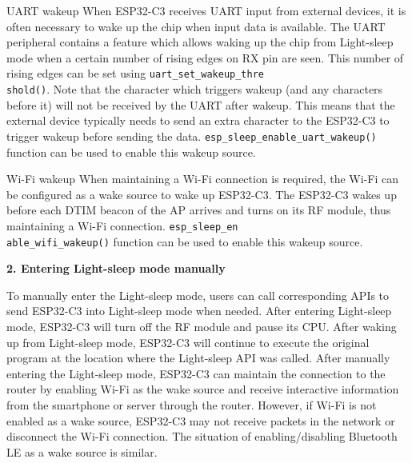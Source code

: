 \documentclass[a4paper,12pt]{book}
\begin{document}
\begin{term}{UART wakeup}
    When ESP32-C3 receives UART input from external devices, it is often necessary to wake up the chip when input data is available. The UART peripheral contains a feature which allows waking up the chip from Light-sleep mode when a certain number of rising edges on RX pin are seen. This number of rising edges can be set using \verb|uart_set_wakeup_thre|\\ \verb|shold()|. Note that the character which triggers wakeup (and any characters before it) will not be received by the UART after wakeup. This means that the external device typically needs to send an extra character to the ESP32-C3 to trigger wakeup before sending the data. \verb|esp_sleep_enable_uart_wakeup()| function can be used to enable this wakeup source.
\end{term}

\begin{term}{Wi-Fi wakeup}
    When maintaining a Wi-Fi connection is required, the Wi-Fi can be configured as a wake source to wake up ESP32-C3. The ESP32-C3 wakes up before each DTIM beacon of the AP arrives and turns on its RF module, thus maintaining a Wi-Fi connection. \verb|esp_sleep_en|\\ \verb|able_wifi_wakeup()| function can be used to enable this wakeup source.
\end{term}

\textbf{2. Entering Light-sleep mode manually}

To manually enter the Light-sleep mode, users can call corresponding APIs to send ESP32-C3 into Light-sleep mode when needed. After entering Light-sleep mode, ESP32-C3 will turn off the RF module and pause its CPU. After waking up from Light-sleep mode, ESP32-C3 will continue to execute the original program at the location where the Light-sleep API was called. After manually entering the Light-sleep mode, ESP32-C3 can maintain the connection to the router by enabling Wi-Fi as the wake source and receive interactive information from the smartphone or server through the router. However, if Wi-Fi is not enabled as a wake source, ESP32-C3 may not receive packets in the network or disconnect the Wi-Fi connection. The situation of enabling/disabling Bluetooth LE as a wake source is similar.

\end{document}
